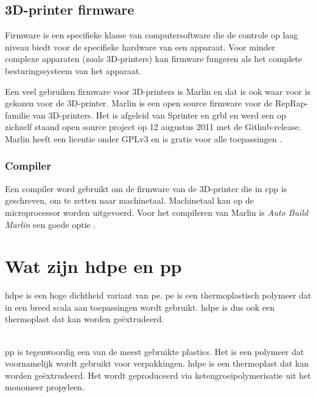 \subsection{3D-printer firmware}

Firmware is een specifieke klasse van computersoftware die de controle op laag
niveau biedt voor de specifieke hardware van een apparaat.  Voor minder
complexe apparaten (zoals 3D-printers) kan firmware fungeren als het complete
besturingssysteem van het apparaat.

Een veel gebruiken firmware voor 3D-printers is Marlin en dat is ook waar voor
is gekozen voor de 3D-printer.  Marlin is een open source firmware voor de
RepRap-familie van 3D-printers. Het is afgeleid van Sprinter en grbl en werd
een op zichzelf staand open source project op 12 augustus 2011 met de
Github-release. Marlin heeft een licentie onder GPLv3 en is gratis voor alle
toepassingen \cite{Marlin}. 

\subsubsection{Compiler}

Een compiler word gebruikt om de firmware van de 3D-printer die in \ac{cpp} is
geschreven, om te zetten naar machinetaal. Machinetaal kan op de microprocessor
worden uitgevoerd.  Voor het compileren van Marlin is \emph{Auto Build Marlin}
een goede optie \cite{Auto_Build_Marlin}.


\section{Wat zijn \ac{hdpe} en \ac{pp}}

\ac{hdpe} is een hoge dichtheid variant van \ac{pe}. \ac{pe} is een
thermoplastisch polymeer dat in een breed scala aan toepassingen wordt
gebruikt. \ac{hdpe} is dus ook een thermoplast dat kan worden geëxtrudeerd.\\\

\noindent \ac{pp} is tegenwoordig een van de meest gebruikte plastics. Het is
een polymeer dat voornamelijk wordt gebruikt voor verpakkingen. \ac{hdpe} is
een thermoplast dat kan worden geëxtrudeerd. Het wordt geproduceerd via
ketengroeipolymerisatie uit het monomeer propyleen.

